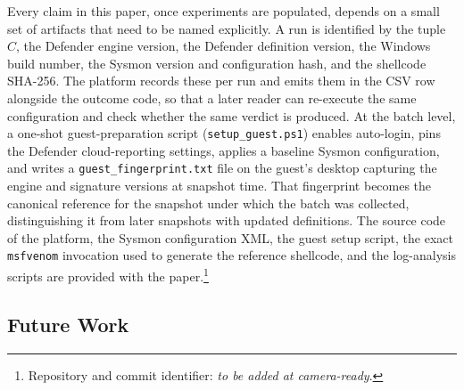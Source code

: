 Every claim in this paper, once experiments are populated, depends on a small set of artifacts that need to be named explicitly.
A run is identified by the tuple $C$, the Defender engine version, the Defender definition version, the Windows build number, the Sysmon version and configuration hash, and the shellcode SHA-256.
The platform records these per run and emits them in the CSV row alongside the outcome code, so that a later reader can re-execute the same configuration and check whether the same verdict is produced.
At the batch level, a one-shot guest-preparation script (\texttt{setup\_guest.ps1}) enables auto-login, pins the Defender cloud-reporting settings, applies a baseline Sysmon configuration, and writes a \texttt{guest\_fingerprint.txt} file on the guest's desktop capturing the engine and signature versions at snapshot time.
That fingerprint becomes the canonical reference for the snapshot under which the batch was collected, distinguishing it from later snapshots with updated definitions.
The source code of the platform, the Sysmon configuration XML, the guest setup script, the exact \texttt{msfvenom} invocation used to generate the reference shellcode, and the log-analysis scripts are provided with the paper.\footnote{Repository and commit identifier: \textit{to be added at camera-ready}.}

\subsection{Future Work}

